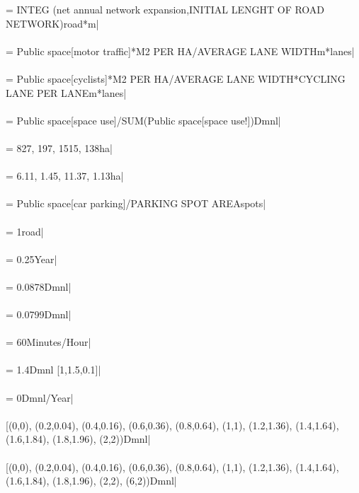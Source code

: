  =  INTEG (net annual network expansion,INITIAL LENGHT OF ROAD NETWORK)road*m| \\ \\ 
 = Public space[motor traffic]*M2 PER HA/AVERAGE LANE WIDTHm*lanes| \\ \\ 
 = Public space[cyclists]*M2 PER HA/AVERAGE LANE WIDTH*CYCLING LANE PER LANEm*lanes| \\ \\ 
 = Public space[space use]/SUM(Public space[space use!])Dmnl| \\ \\ 
 = 827, 197, 1515, 138ha| \\ \\ 
 = 6.11, 1.45, 11.37, 1.13ha| \\ \\ 
 = Public space[car parking]/PARKING SPOT AREAspots| \\ \\ 
 = 1road| \\ \\ 
 = 0.25Year| \\ \\ 
 = 0.0878Dmnl| \\ \\ 
 = 0.0799Dmnl| \\ \\ 
 = 60Minutes/Hour| \\ \\ 
 = 1.4Dmnl [1,1.5,0.1]| \\ \\ 
 = 0Dmnl/Year| \\ \\ 
 [(0,0), (0.2,0.04), (0.4,0.16), (0.6,0.36), (0.8,0.64), (1,1), (1.2,1.36), (1.4,1.64), (1.6,1.84), (1.8,1.96), (2,2))Dmnl| \\ \\ 
 [(0,0), (0.2,0.04), (0.4,0.16), (0.6,0.36), (0.8,0.64), (1,1), (1.2,1.36), (1.4,1.64), (1.6,1.84), (1.8,1.96), (2,2), (6,2))Dmnl| \\ \\ 
